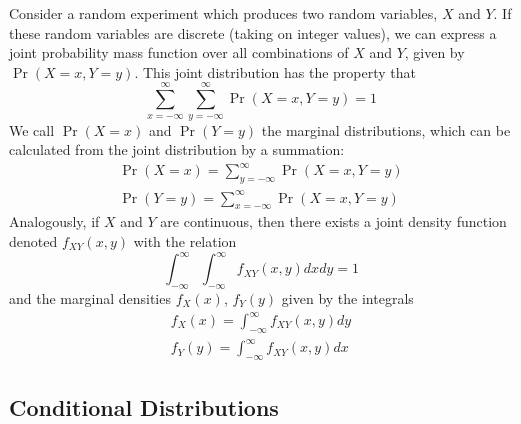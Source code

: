 \documentclass[11pt]{report} %
\begin{document}
Consider a random experiment which produces two random variables, $X$ and $Y$. If these random variables are discrete (taking on integer values), we can express a joint probability mass function over all combinations of $X$ and $Y$, given by $\operatorname{Pr}\left(X = x, Y = y\right)$. This joint distribution has the property that
\begin{equation}
\sum_{x = -\infty}^{\infty}\sum_{y = -\infty}^{\infty}\operatorname{Pr}\left(X = x, Y = y\right) = 1
\end{equation}
We call $\operatorname{Pr}\left(X = x\right)$ and $\operatorname{Pr}\left(Y = y\right)$ the marginal distributions, which can be calculated from the joint distribution by a summation:
\begin{gather}
\operatorname{Pr}\left(X = x\right) = \sum_{y = -\infty}^{\infty}\operatorname{Pr}\left(X = x, Y = y\right) \\
\operatorname{Pr}\left(Y = y\right) = \sum_{x = -\infty}^{\infty}\operatorname{Pr}\left(X = x, Y = y\right)
\end{gather}
Analogously, if $X$ and $Y$ are continuous, then there exists a joint density function denoted $f_{XY}\left(x, y\right)$ with the relation
\begin{equation}
\int_{-\infty}^{\infty}\int_{-\infty}^{\infty}f_{XY}\left(x, y\right)dxdy = 1
\end{equation}
and the marginal densities $f_{X}\left(x\right)$, $f_{Y}\left(y\right)$ given by the integrals
\begin{gather}
f_{X}\left(x\right) = \int_{-\infty}^{\infty}f_{XY}\left(x, y\right)dy \\
f_{Y}\left(y\right) = \int_{-\infty}^{\infty}f_{XY}\left(x, y\right)dx
\end{gather}

\subsection{Conditional Distributions}
\end{document}
